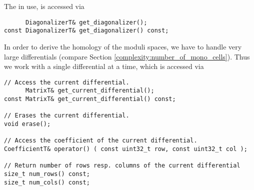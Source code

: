 The  in use, is accessed via
\begin{lstlisting}
      DiagonalizerT& get_diagonalizer();
const DiagonalizerT& get_diagonalizer() const;
\end{lstlisting}

In order to derive the homology of the moduli spaces, we have to handle very large differentials (compare Section \ref{complexity:number_of_mono_cells}).
Thus we work with a single differential at a time, which is accessed via
\begin{lstlisting}
// Access the current differential.
      MatrixT& get_current_differential();
const MatrixT& get_current_differential() const;

// Erases the current differential.
void erase();

// Access the coefficient of the current differential.
CoefficientT& operator() ( const uint32_t row, const uint32_t col );
    
// Return number of rows resp. columns of the current differential
size_t num_rows() const;
size_t num_cols() const;
\end{lstlisting}

